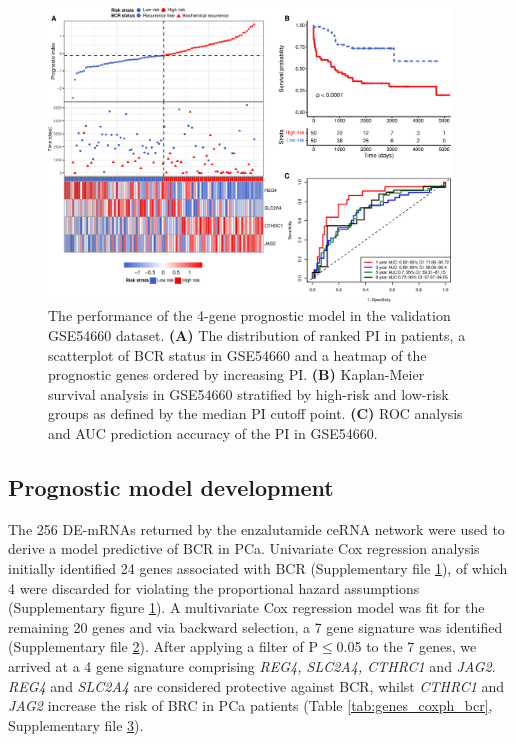 \documentclass[twocolumn]{bmcart}%
\begin{document}
\begin{figure}[ht!]
    \includegraphics[width=0.95\textwidth]{figures/GSE54660_plot.png}
    \caption{The performance of the 4-gene prognostic model in the validation GSE54660 dataset. \textbf{(A)} The distribution of ranked PI in patients, a scatterplot of BCR status in GSE54660 and a heatmap of the prognostic genes ordered by increasing PI. \textbf{(B)} Kaplan-Meier survival analysis in GSE54660 stratified by high-risk and low-risk groups as defined by the median PI cutoff point. \textbf{(C)} ROC analysis and AUC prediction accuracy of the PI in GSE54660.}
    \label{fig:gse54460_data}
\end{figure}

\subsection*{\textbf{Prognostic model development}}
The 256 DE-mRNAs returned by the enzalutamide ceRNA network were used to derive a model predictive of BCR in PCa. Univariate Cox regression analysis initially identified 24 genes associated with BCR (Supplementary file \href{https://github.com/BarryDigby/pca_network/blob/main/results/TCGA_DFS/ceRNA_genes_univariate_cox.csv}{1}), of which 4 were discarded for violating the proportional hazard assumptions (Supplementary figure \href{https://github.com/BarryDigby/pca_network/blob/main/results/TCGA_DFS/schoenfeld_residuals.pdf}{1}). A multivariate Cox regression model was fit for the remaining 20 genes and via backward selection, a 7 gene signature was identified (Supplementary file \href{https://github.com/BarryDigby/pca_network/blob/main/results/TCGA_DFS/stepAIC_summary.csv}{2}). After applying a filter of P$\leq$0.05 to the 7 genes, we arrived at a 4 gene signature comprising \textit{REG4, SLC2A4, CTHRC1} and \textit{JAG2}. \textit{REG4} and \textit{SLC2A4} are considered protective against BCR, whilst \textit{CTHRC1} and \textit{JAG2} increase the risk of BRC in PCa patients (Table \ref{tab:genes_coxph_bcr}, Supplementary file \href{https://github.com/BarryDigby/pca_network/blob/main/results/TCGA_DFS/4-gene-gepia.png}{3}). \par
\end{document}
